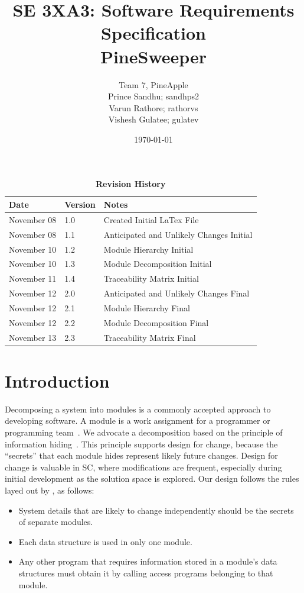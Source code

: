 \documentclass[12pt, titlepage]{article}
\title{SE 3XA3: Software Requirements Specification\\PineSweeper}
\author{Team 7, PineApple
		\\ Prince Sandhu; sandhps2
		\\ Varun Rathore; rathorvs
		\\ Vishesh Gulatee; gulatev
}
\date{\today}
\begin{document}
\maketitle
{}
\tableofcontents
\listoftables
\listoffigures
\clearpage
\begin{table}[!htbp]
\caption{\bf Revision History}
\begin{tabularx}{\textwidth}{p{3cm}p{3cm}X}
\toprule {\bf Date} & {\bf Version} & {\bf Notes}\\
\midrule
November 08 & 1.0 & Created Initial LaTex File\\
November 08 & 1.1 & Anticipated and Unlikely Changes Initial\\
November 10 & 1.2 & Module Hierarchy Initial\\
November 10 & 1.3 & Module Decomposition Initial\\
November 11 & 1.4 & Traceability Matrix Initial\\
November 12 & 2.0 & Anticipated and Unlikely Changes Final\\
November 12 & 2.1 & Module Hierarchy Final\\
November 12 & 2.2 & Module Decomposition Final\\
November 13 & 2.3 & Traceability Matrix Final\\
\bottomrule
\end{tabularx}
\end{table}

\newpage
\section{Introduction}
Decomposing a system into modules is a commonly accepted approach to developing
software.  A module is a work assignment for a programmer or programming
team~\citep{ParnasEtAl1984}.  We advocate a decomposition
based on the principle of information hiding~\citep{Parnas1972a}.  This
principle supports design for change, because the ``secrets'' that each module
hides represent likely future changes.  Design for change is valuable in SC,
where modifications are frequent, especially during initial development as the
solution space is explored.  
Our design follows the rules layed out by \citet{ParnasEtAl1984}, as follows:

\begin{itemize}
\item System details that are likely to change independently should be the
  secrets of separate modules.
\item Each data structure is used in only one module.
\item Any other program that requires information stored in a module's data
  structures must obtain it by calling access programs belonging to that module.
\end{itemize}
\end{document}
